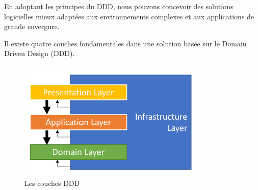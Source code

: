En adoptant les principes du DDD, nous pouvons concevoir des solutions logicielles mieux adaptées aux environnements complexes et aux applications de grande envergure.

Il existe quatre couches fondamentales dans une solution basée sur le Domain Driven Design (DDD).

\begin{figure}[H] 
    \centering
    \includegraphics[width=9cm]{Figures/dddl.png}
        \caption{Les couches DDD}
\end{figure}


